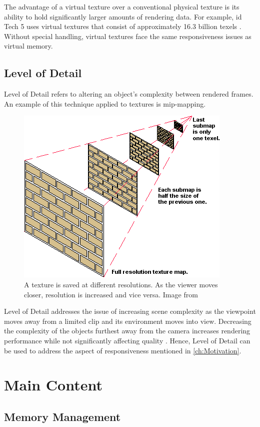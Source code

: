 The advantage of a virtual texture over a conventional physical texture is its ability to hold significantly larger amounts of rendering data. For example, id Tech 5 uses virtual textures that consist of approximately 16.3 billion texels \cite{van2009id}. Without special handling, virtual textures face the same responsiveness issues as virtual memory.

\section{Level of Detail}

Level of Detail refers to altering an object's complexity between rendered frames. An example of this technique applied to textures is mip-mapping. 

\begin{figure}[h]
  \begin{center}
    \includegraphics[width=.3\textwidth]{logos/mipmap_example.png}
    \caption{A texture is saved at different resolutions. As the viewer moves closer, resolution is increased and vice versa. Image from \cite{PCMag:DefMipMapping:2017}}
  \end{center}
\end{figure}

Level of Detail addresses the issue of increasing scene complexity as the viewpoint moves away from a limited clip and its environment moves into view. Decreasing the complexity of the objects furthest away from the camera increases rendering performance while not significantly affecting quality \cite{Unity:LevelOfDetail:2017}. Hence, Level of Detail can be used to address the aspect of responsiveness mentioned in \ref{ch:Motivation}.

\chapter{Main Content}
\label{ch:MainContent}

\section{Memory Management}

